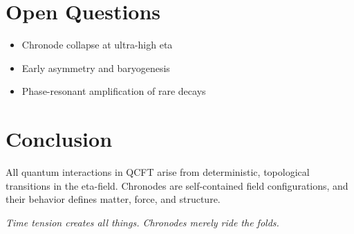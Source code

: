 \documentclass[12pt]{article}
\begin{document}
\section{Open Questions}

\begin{itemize}
\item Chronode collapse at ultra-high eta
\item Early asymmetry and baryogenesis
\item Phase-resonant amplification of rare decays
\end{itemize}

\section*{Conclusion}

All quantum interactions in QCFT arise from deterministic, topological transitions in the eta-field. Chronodes are self-contained field configurations, and their behavior defines matter, force, and structure.

\begin{center}
\textit{Time tension creates all things. Chronodes merely ride the folds.}
\end{center}
\end{document}
